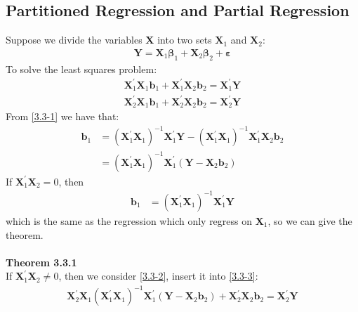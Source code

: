 \documentclass{article}
\begin{document}
\subsection{Partitioned Regression and Partial Regression}
Suppose we divide the variables $\boldsymbol{X}$ into two sets $\boldsymbol{X}_1$ and $\boldsymbol{X}_2$:
	\begin{align*}
		\boldsymbol{Y} = \boldsymbol{X}_1 \boldsymbol{\beta}_1 + \boldsymbol{X}_2 \boldsymbol{\beta}_2 + \boldsymbol{\varepsilon}
	\end{align*}
To solve the least squares problem:
	\begin{align}
		\boldsymbol{X}^\prime_1 \boldsymbol{X}_1 \boldsymbol{b}_1 + \boldsymbol{X}^\prime_1 \boldsymbol{X}_2 \boldsymbol{b}_2 = \boldsymbol{X}^\prime_1 \boldsymbol{Y} \label{3.3-1}\\
		\boldsymbol{X}^\prime_2 \boldsymbol{X}_1 \boldsymbol{b}_1 + \boldsymbol{X}^\prime_2 \boldsymbol{X}_2 \boldsymbol{b}_2 = \boldsymbol{X}^\prime_2 \boldsymbol{Y} \label{3.3-2}
	\end{align}
From \eqref{3.3-1} we have that:
	\begin{align*}
		\boldsymbol{b}_1 &= (\boldsymbol{X}^\prime_1 \boldsymbol{X}_1)^{-1} \boldsymbol{X}^\prime_1 \boldsymbol{Y} - (\boldsymbol{X}^\prime_1 \boldsymbol{X}_1)^{-1} \boldsymbol{X}^\prime_1 \boldsymbol{X}_2 \boldsymbol{b}_2\\
		&= (\boldsymbol{X}^\prime_1 \boldsymbol{X}_1)^{-1} \boldsymbol{X}^\prime_1 (\boldsymbol{Y}- \boldsymbol{X}_2 \boldsymbol{b}_2)
	\end{align*}
If $\boldsymbol{X}^\prime_1  \boldsymbol{X}_2 = 0$, then 
	\begin{align}
		\boldsymbol{b}_1 &= (\boldsymbol{X}^\prime_1 \boldsymbol{X}_1)^{-1} \boldsymbol{X}^\prime_1 \boldsymbol{Y} \label{3.3-3}
	\end{align}
which is the same as the regression which only regress on $\boldsymbol{X}_1$, so we can give the theorem.\\\\
\textbf{Theorem 3.3.1}\\
If $\boldsymbol{X}^\prime_1  \boldsymbol{X}_2 \neq 0$, then we consider \eqref{3.3-2}, insert it into \eqref{3.3-3}:
	\begin{align*}
		\boldsymbol{X}^\prime_2 \boldsymbol{X}_1 (\boldsymbol{X}^\prime_1 \boldsymbol{X}_1)^{-1} \boldsymbol{X}^\prime_1 (\boldsymbol{Y}- \boldsymbol{X}_2 \boldsymbol{b}_2) + \boldsymbol{X}^\prime_2 \boldsymbol{X}_2 \boldsymbol{b}_2 = \boldsymbol{X}^\prime_2 \boldsymbol{Y}
	\end{align*}
\end{document}
